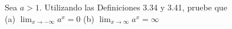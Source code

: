 \item Sea $a > 1$. Utilizando las Definiciones 3.34 y 3.41, pruebe que\\
(a) $\displaystyle \lim_{x \to -\infty} a^x = 0$ \qquad (b) $\displaystyle \lim_{x \to \infty} a^x = \infty$
